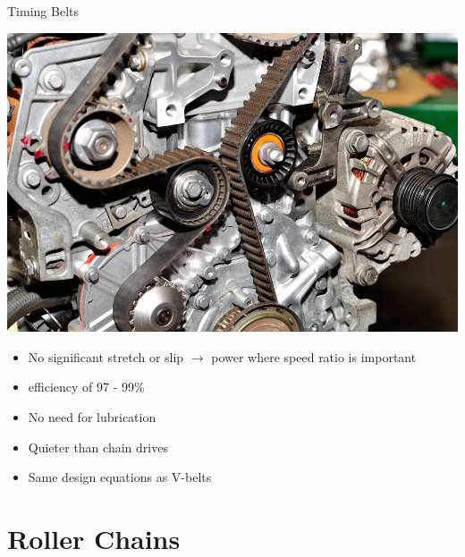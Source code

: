 \documentclass[10pt, svgnames]{beamer}
\begin{document}
\begin{frame}[label={sec:orgc3b8180}]{Timing Belts}
\begin{center}
\includegraphics[width=.9\linewidth]{./pictures/timing-belt.jpg}
\end{center}
\begin{itemize}
\item No significant stretch or slip \(\rightarrow\) power where speed ratio is important
\item efficiency of 97 - 99\%
\item No need for lubrication
\item Quieter than chain drives
\item Same design equations as V-belts
\end{itemize}
\end{frame}

\section{Roller Chains}
\label{sec:org90331cd}
\end{document}
